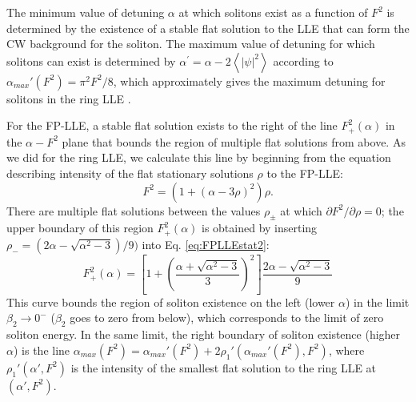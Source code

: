 The minimum value of detuning $\alpha$ at which solitons exist as a function of $F^2$ is determined by the existence of a stable flat solution to the LLE that can form the CW background for the soliton. The maximum value of detuning for which solitons can exist is determined by $\alpha^\prime=\alpha-2\left<|\psi|^2\right>$ according to $\alpha_{max}'(F^2)=\pi^2 F^2/8$, which approximately gives the maximum detuning for solitons in the ring LLE \cite{Herr2014}. 

For the FP-LLE, a stable flat solution exists to the right of the line $F_+^2 (\alpha)$ in the $\alpha-F^2$ plane that bounds the region of multiple flat solutions from above. As we did for the ring LLE, we calculate this line by beginning from the equation describing intensity of the flat stationary solutions $\rho$ to the FP-LLE:
\begin{equation}
F^2=(1+(\alpha-3\rho)^2)\rho. \label{eq:FPLLEstat2}
\end{equation} 
There are multiple flat solutions between the values $\rho_\pm$ at which $\partial F^2/\partial\rho=0$; the upper boundary of this region $F_+^2 (\alpha)$ is obtained by inserting $\rho_-=(2\alpha-\sqrt{\alpha^2-3})/9)$ into Eq. \ref{eq:FPLLEstat2}:
\begin{equation}
F_+^2 (\alpha)=\left[1+\left(\frac{\alpha+\sqrt{\alpha^2-3}}{3}\right)^2\right]\frac{2\alpha-\sqrt{\alpha^2-3}}{9}
\end{equation}
This curve bounds the region of soliton existence on the left (lower $\alpha$) in the limit $\beta_2\rightarrow0^-$ ($\beta_2$ goes to zero from below), which corresponds to the limit of zero soliton energy. In the same limit, the right boundary of soliton existence (higher $\alpha$) is the line $\alpha_{max}(F^2)=\alpha_{max}'(F^2)+2\rho_1'(\alpha_{max}'(F^2),F^2)$, where $\rho_1'(\alpha',F^2)$ is the intensity of the smallest flat solution to the ring LLE at $(\alpha',F^2)$.

